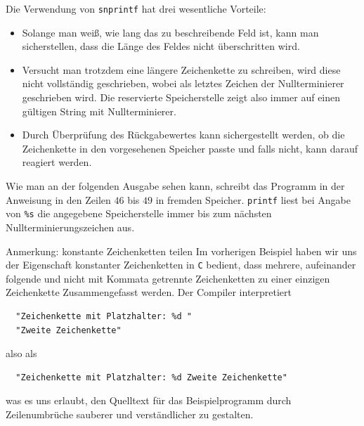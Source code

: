 Die Verwendung von \texttt{snprintf} hat drei wesentliche Vorteile:
\begin{itemize}
 \item Solange man weiß, wie lang das zu beschreibende Feld ist, kann man sicherstellen, dass die Länge des Feldes nicht überschritten wird.
 \item Versucht man trotzdem eine längere Zeichenkette zu schreiben, wird diese nicht vollständig geschrieben, wobei als letztes Zeichen der Nullterminierer geschrieben wird. Die reservierte Speicherstelle zeigt also immer auf einen gültigen String mit Nullterminierer.
 \item Durch Überprüfung des Rückgabewertes kann sichergestellt werden, ob die Zeichenkette in den vorgesehenen Speicher passte und falls nicht, kann darauf reagiert werden.
\end{itemize}
Wie man an der folgenden Ausgabe sehen kann, schreibt das Programm in der Anweisung in den Zeilen $46$ bis $49$ in fremden Speicher.
\texttt{printf} liest bei Angabe von \texttt{\%s} die angegebene Speicherstelle immer bis zum nächsten Nullterminierungszeichen aus.

\begin{myalertblock}{Anmerkung: konstante Zeichenketten teilen}
Im vorherigen Beispiel haben wir uns der Eigenschaft konstanter Zeichenketten in \texttt{C} bedient, dass mehrere, aufeinander folgende und nicht mit Kommata getrennte Zeichenketten zu einer einzigen Zeichenkette Zusammengefasst werden.
Der Compiler interpretiert
\begin{lstlisting}
  "Zeichenkette mit Platzhalter: %d "
  "Zweite Zeichenkette"
\end{lstlisting}
also als
\begin{lstlisting}
  "Zeichenkette mit Platzhalter: %d Zweite Zeichenkette"
\end{lstlisting}
was es uns erlaubt, den Quelltext für das Beispielprogramm durch Zeilenumbrüche sauberer und verständlicher zu gestalten.
\end{myalertblock}

\endinput
